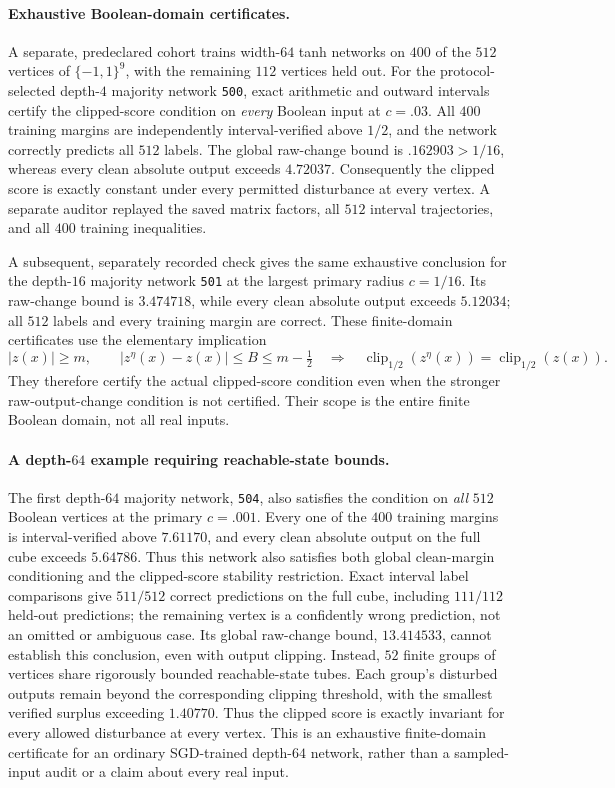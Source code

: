\paragraph{Exhaustive Boolean-domain certificates.}
A separate, predeclared cohort trains width-$64$ tanh networks on $400$ of the $512$ vertices of $\{-1,1\}^9$, with the remaining $112$ vertices held out.  For the protocol-selected depth-$4$ majority network \texttt{500}, exact arithmetic and outward intervals certify the clipped-score condition on \emph{every} Boolean input at $c=.03$.  All $400$ training margins are independently interval-verified above $1/2$, and the network correctly predicts all $512$ labels.  The global raw-change bound is $.162903>1/16$, whereas every clean absolute output exceeds $4.72037$.  Consequently the clipped score is exactly constant under every permitted disturbance at every vertex.  A separate auditor replayed the saved matrix factors, all $512$ interval trajectories, and all $400$ training inequalities.

A subsequent, separately recorded check gives the same exhaustive conclusion for the depth-$16$ majority network \texttt{501} at the largest primary radius $c=1/16$.  Its raw-change bound is $3.474718$, while every clean absolute output exceeds $5.12034$; all $512$ labels and every training margin are correct.  These finite-domain certificates use the elementary implication
\[
 |z(x)|\ge m,\qquad |z^\eta(x)-z(x)|\le B\le m-\tfrac12
 \quad\Longrightarrow\quad
 \operatorname{clip}_{1/2}(z^\eta(x))=\operatorname{clip}_{1/2}(z(x)).
\]
They therefore certify the actual clipped-score condition even when the stronger raw-output-change condition is not certified.  Their scope is the entire finite Boolean domain, not all real inputs.

\paragraph{A depth-$64$ example requiring reachable-state bounds.}
The first depth-$64$ majority network, \texttt{504}, also satisfies the condition on \emph{all} $512$ Boolean vertices at the primary $c=.001$.  Every one of the $400$ training margins is interval-verified above $7.61170$, and every clean absolute output on the full cube exceeds $5.64786$.  Thus this network also satisfies both global clean-margin conditioning and the clipped-score stability restriction.  Exact interval label comparisons give $511/512$ correct predictions on the full cube, including $111/112$ held-out predictions; the remaining vertex is a confidently wrong prediction, not an omitted or ambiguous case.  Its global raw-change bound, $13.414533$, cannot establish this conclusion, even with output clipping.  Instead, $52$ finite groups of vertices share rigorously bounded reachable-state tubes.  Each group's disturbed outputs remain beyond the corresponding clipping threshold, with the smallest verified surplus exceeding $1.40770$.  Thus the clipped score is exactly invariant for every allowed disturbance at every vertex.  This is an exhaustive finite-domain certificate for an ordinary SGD-trained depth-$64$ network, rather than a sampled-input audit or a claim about every real input.

